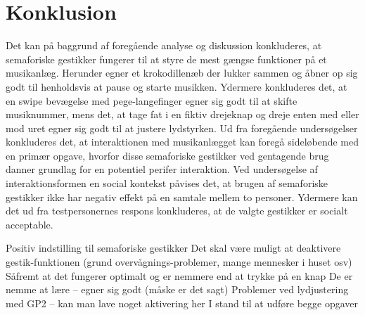 \chapter{Konklusion}
\label{Konklusion}
%
Det kan på baggrund af foregående analyse og diskussion konkluderes, at semaforiske gestikker fungerer til at styre de mest gængse funktioner på et musikanlæg. Herunder egner et krokodillenæb der lukker sammen og åbner op sig godt til henholdsvis at pause og starte musikken. Ydermere konkluderes det, at en swipe bevægelse med pege-langefinger egner sig godt til at skifte musiknummer, mens det, at tage fat i en fiktiv drejeknap og dreje enten med eller mod uret egner sig godt til at justere lydstyrken. Ud fra foregående undersøgelser konkluderes det, at interaktionen med musikanlægget kan foregå sideløbende med en primær opgave, hvorfor disse semaforiske gestikker ved gentagende brug danner grundlag for en potentiel perifer interaktion. 
Ved undersøgelse af interaktionsformen en social kontekst påvises det, at brugen af semaforiske gestikker ikke har negativ effekt på en samtale mellem to personer. Ydermere kan det ud fra testpersonernes respons konkluderes, at de valgte gestikker er socialt acceptable. 

Positiv indstilling til semaforiske gestikker
Det skal være muligt at deaktivere gestik-funktionen (grund overvågnings-problemer, mange mennesker i huset osv) 
Såfremt at det fungerer optimalt og er nemmere end at trykke på en knap
De er nemme at lære – egner sig godt (måske er det sagt)
Problemer ved lydjustering med GP2 – kan man lave noget aktivering her 
I stand til at udføre begge opgaver
